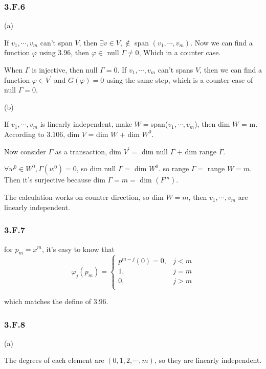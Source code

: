 \subsubsection*{3.F.6}

(a)

If $v_{1},\cdots,v_{m}$ can't span $V$, then $\exists v\in V, \notin$ span $(v_{1}, \cdots, v_{m})$. Now we can find a function $\varphi$ using $3.96$, then $\varphi \in $ null $\Gamma \neq {0}$, Which in a counter case.


When $\Gamma$ is injective, then null $\Gamma = {0}$. If $v_{1},\cdots,v_{m}$ can't spans $V$, then we can find a function $\varphi \in V^{'}$  and $G(\varphi) = 0$ using the same step, which is a counter case of null $\Gamma = 0$.

(b) 

If $v_{1},\cdots,v_{m}$ is linearly independent, make $W = $span($v_{1},\cdots,v_{m}$), then dim $W$ = m. According to $3.106$, dim $V$ = dim $W$ + dim $W^{0}$.

Now consider $\Gamma$ as a transaction, dim $V^{'} = $ dim null $\Gamma$ + dim range $\Gamma$. 

$\forall w^{0} \in W^{0}, \Gamma(w^{0}) = 0$, so dim null $\Gamma = $ dim $W^{0}$. so range $\Gamma = $ range $W = m$. Then it's surjective because dim $\Gamma = m = $ dim $(F^{m})$.

The calculation works on counter direction, so dim $W = m$, then $v_{1}, \cdots, v_{m}$ are linearly independent.

\subsubsection*{3.F.7}

for $p_{m} = x^{m}$, it's easy to know that
\[
\varphi_{j}(p_{m}) =
\begin{cases}
p^{m-j}(0) = 0,&j<m \\
1,&j=m \\
0,&j>m \\
\end{cases}
\]

which matches the define of $3.96$.

\subsubsection*{3.F.8}
(a)

The degrees of each element are $(0,1,2,\cdots, m)$, so they are linearly independent.


